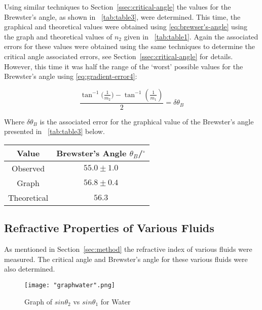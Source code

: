 \documentclass{article}
\newcommand{\tabref}[2][\tablename~]{#1\ref{#2}}
\newcommand{\secref}[2][Section~]{#1\ref{#2}}
\begin{document}
Using similar techniques to \secref{ssec:critical-angle} the values for the Brewster's angle, as shown in \tabref{tab:table3}, were determined. This time, the graphical and theoretical values were obtained using \eqref{eq:brewser's-angle} using the graph and theoretical values of $n_2$ given in \tabref{tab:table1}. Again the associated errors for these values were obtained using the same techniques to determine the critical angle associated errors, see \secref{ssec:critical-angle} for details. However, this time it was half the range of the `worst' possible values for the Brewster's angle using \eqref{eq:gradient-error4}:

\begin{equation}
\label{eq:gradient-error4}
\frac{\tan^{-1}({\frac{1}{m_2})} - \tan^{-1}(\frac{1}{m_{1}})}{2} = \delta{\theta_B}
\end{equation} 

\vspace{2mm}
\noindent
Where $\delta{\theta_B}$ is the associated error for the graphical value of the Brewster's angle presented in \tabref{tab:table3} below.

\vspace{5mm}
\begin{table*}[h]
\centering %
\caption{Table of Calculated Values and Published Values for the Brewster's Angle of Acrylic}
\label{tab:table3}
\begin{tabular}{|c|c|}
\hline
Value & Brewster's Angle $\theta_B$/$^{\circ}$ \\
\hline
Observed & $55.0 \pm 1.0$  \\
\hline
Graph & $56.8 \pm 0.4$ \\
\hline
Theoretical \cite{Paper01} & $56.3$ \\
\hline
\end{tabular}
\end{table*}

\subsection{Refractive Properties of Various Fluids}
\label{ssec:properties-of-fluids}

\vspace{5mm}
As mentioned in \secref{sec:method} the refractive index of various fluids were measured. The critical angle and Brewster's angle for these various fluids were also determined. 

\begin{figure}[h]
\centering
\texttt{[image: "graphwater".png]}
\caption{Graph of $sin{\theta_2}$ vs $sin{\theta_1}$ for Water}
\label{fig:graph2}
\end{figure}
\end{document}
